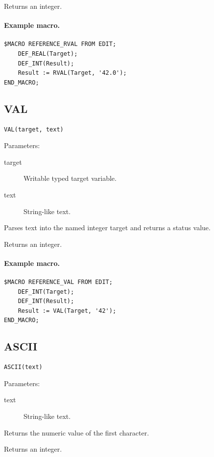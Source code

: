 \documentclass[a4paper,10pt,twoside,openany]{book}
\begin{document}
Returns an integer.

\paragraph{Example macro.}
\begin{verbatim}
$MACRO REFERENCE_RVAL FROM EDIT;
    DEF_REAL(Target);
    DEF_INT(Result);
    Result := RVAL(Target, '42.0');
END_MACRO;
\end{verbatim}

\label{prim:intrinsic-val}
\subsection*{VAL}
\begin{verbatim}
VAL(target, text)
\end{verbatim}
Parameters:
\begin{description}
\item[target] Writable typed target variable.
\item[text] String-like text.
\end{description}

Parses text into the named integer target and returns a status value.

Returns an integer.

\paragraph{Example macro.}
\begin{verbatim}
$MACRO REFERENCE_VAL FROM EDIT;
    DEF_INT(Target);
    DEF_INT(Result);
    Result := VAL(Target, '42');
END_MACRO;
\end{verbatim}

\label{prim:intrinsic-ascii}
\subsection*{ASCII}
\begin{verbatim}
ASCII(text)
\end{verbatim}
Parameters:
\begin{description}
\item[text] String-like text.
\end{description}

Returns the numeric value of the first character.

Returns an integer.
\end{document}
